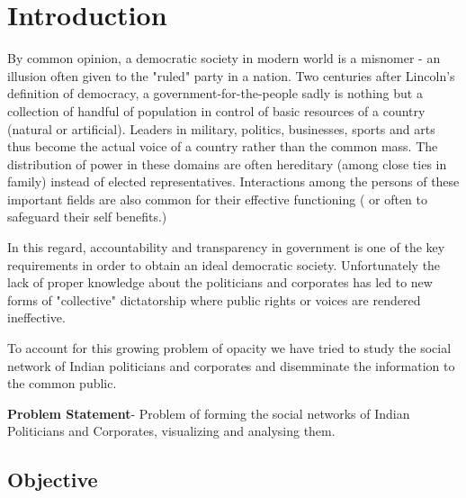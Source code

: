 \chapter{Introduction}


By common opinion, a democratic society in modern world is a misnomer - an illusion often given to the "ruled" party in a nation. Two centuries after Lincoln's definition of democracy, a government-for-the-people sadly is nothing but a collection of handful of population in control of basic resources of a country (natural or artificial). Leaders in military, politics, businesses, sports and arts thus become the actual voice of a country rather than the common mass. The distribution of power in these domains are often hereditary (among close ties in family) instead of elected representatives. Interactions among the persons of these important fields are also common for their effective functioning ( or often to safeguard their self benefits.)

In this regard, accountability and transparency in government is one of the key requirements in order to obtain an ideal democratic society. Unfortunately the lack of proper knowledge about the politicians and corporates has led to new forms of "collective" dictatorship where public rights or voices are rendered ineffective.

To account for this growing problem of opacity we have tried to study the social network of Indian politicians and corporates and disemminate the information to the common public.

\textbf{Problem Statement}-
Problem of forming the social networks of Indian Politicians and Corporates, visualizing  and analysing them.

\section{Objective}

